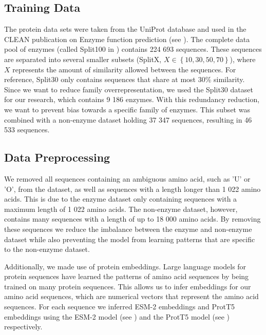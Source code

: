 \documentclass{bioinfo}
\begin{document}
\begin{methods}
\subsection{Training Data}

The protein data sets were taken from the UniProt database and used in the CLEAN publication on Enzyme function prediction (see \cite{CleanArticle}). 
The complete data pool of enzymes (called Split100 in \cite{CleanArticle}) contains 224 693 sequences. 
These sequences are separated into several smaller subsets (SplitX, $X \in \left\{10, 30, 50, 70\right\}$), where $X$ represents the amount of similarity allowed between the sequences.
For reference, Split30 only contains sequences that share at most 30\% similarity.
Since we want to reduce family overrepresentation, we used the Split30 dataset for our research,
which contains 9 186 enzymes.
With this redundancy reduction, we want to prevent bias towards a specific family of enzymes.
This subset was combined with a non-enzyme dataset holding 37 347 sequences, resulting in 46 533 sequences.

\subsection{Data Preprocessing}
We removed all sequences containing an ambiguous amino acid, such as 'U' or 'O', from the dataset, as well as
sequences with a length longer than 1 022 amino acids. 
This is due to the enzyme dataset only containing sequences with a maximum length of 1 022 amino acids.
The non-enzyme dataset, however, contains many sequences with a length of up to 18 000 amino acids.
By removing these sequences we reduce the imbalance between the enzyme and non-enzyme dataset while also
preventing the model from learning patterns that are specific to the non-enzyme dataset.

Additionally, we made use of protein embeddings.
Large language models for protein sequences have learned the patterns of amino acid sequences by being trained on many protein sequences.
This allows us to infer embeddings for our amino acid sequences, which are numerical vectors that represent the amino acid sequences.
For each sequence we inferred ESM-2 embeddings and ProtT5 embeddings 
using the ESM-2 model (see \cite{ESM2}) and the ProtT5 model (see \cite{ProtT5}) respectively.



\end{methods}
\end{document}
